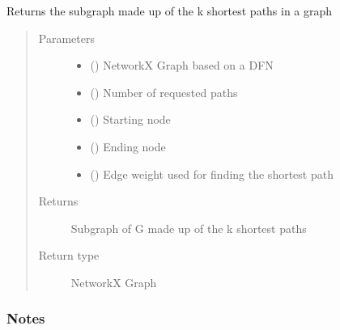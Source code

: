 \documentclass[letterpaper,10pt,english]{sphinxmanual}
\begin{document}
\begin{fulllineitems}

\begin{fulllineitems}
\label{\detokenize{pydfnworks:pydfnworks.general.dfnworks.DFNWORKS.k_shortest_paths_backbone}}
Returns the subgraph made up of the k shortest paths in a graph
\begin{quote}\begin{description}
\item[{Parameters}] \leavevmode\begin{itemize}
\item {} 
 () \textendash{} NetworkX Graph based on a DFN

\item {} 
 () \textendash{} Number of requested paths

\item {} 
 () \textendash{} Starting node

\item {} 
 () \textendash{} Ending node

\item {} 
 () \textendash{} Edge weight used for finding the shortest path

\end{itemize}

\item[{Returns}] \leavevmode
{} \textendash{} Subgraph of G made up of the k shortest paths

\item[{Return type}] \leavevmode
NetworkX Graph

\end{description}\end{quote}
\subsubsection*{Notes}


\end{fulllineitems}
\end{fulllineitems}
\end{document}

